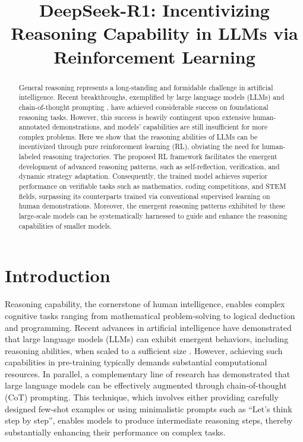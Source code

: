\title{DeepSeek-R1: Incentivizing Reasoning Capability in LLMs via Reinforcement Learning}

\begin{abstract}
General reasoning represents a long-standing and formidable challenge in artificial intelligence. Recent breakthroughs, exemplified by large language models (LLMs) \citep{gpt3, gpt4} and chain-of-thought prompting \citep{wei2022chain}, have achieved considerable success on foundational reasoning tasks. However, this success is heavily contingent upon extensive human-annotated demonstrations, and models' capabilities are still insufficient for more complex problems. Here we show that the reasoning abilities of LLMs can be incentivized through pure reinforcement learning (RL), obviating the need for human-labeled reasoning trajectories. The proposed RL framework facilitates the emergent development of advanced reasoning patterns, such as self-reflection, verification, and dynamic strategy adaptation. Consequently, the trained model achieves superior performance on verifiable tasks such as mathematics, coding competitions, and STEM fields, surpassing its counterparts trained via conventional supervised learning on human demonstrations. Moreover, the emergent reasoning patterns exhibited by these large-scale models can be systematically harnessed to guide and enhance the reasoning capabilities of smaller models.
\end{abstract}

\section{Introduction}\label{sec1}
Reasoning capability, the cornerstone of human intelligence, enables complex cognitive tasks ranging from mathematical problem-solving to logical deduction and programming.  Recent advances in artificial intelligence have demonstrated that large language models (LLMs) can exhibit emergent behaviors, including reasoning abilities, when scaled to a sufficient size \citep{wei2022emergent, kaplan2020scaling}. However, achieving such capabilities in pre-training typically demands substantial computational resources. In parallel, a complementary line of research has demonstrated that large language models can be effectively augmented through chain-of-thought (CoT) prompting. This technique, which involves either providing carefully designed few-shot examples or using minimalistic prompts such as  “Let’s think step by step”\citep{wei2022chain,kojima2022large}, enables models to produce intermediate reasoning steps, thereby substantially enhancing their performance on complex tasks.


